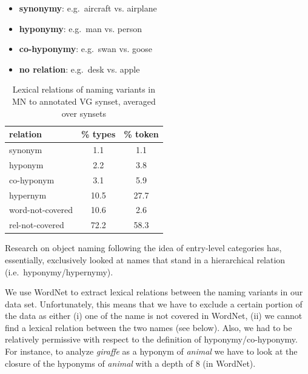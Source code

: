 \begin{itemize}
\item \textbf{synonymy}: e.g.\ aircraft vs. airplane 
\item \textbf{hyponymy}: e.g.\ man vs. person
\item \textbf{co-hyponymy}: e.g.\ swan vs. goose
\item \textbf{no relation}: e.g.\  desk vs. apple
\end{itemize}

\begin{table}
\small
\centering
\begin{tabular}{lcc}
\toprule
         relation & \% types & \% token \\
\midrule
 synonym &  1.1 &  1.1 \\
 hyponym &  2.2 &  3.8 \\
 co-hyponym &  3.1 &  5.9 \\
 hypernym &  10.5 &  27.7 \\
 word-not-covered &  10.6 &  2.6 \\
 rel-not-covered &  72.2 &  58.3 \\
\bottomrule
\end{tabular}
\caption{Lexical relations of naming variants in MN to annotated VG synset, averaged over synsets}
\label{tab:rel}
\end{table}


Research on object naming following the idea of entry-level categories has, essentially, exclusively looked at names that stand in a hierarchical relation (i.e.\ hyponymy/hypernymy).

We use WordNet to extract lexical relations between the naming variants in our data set.
Unfortunately, this means that we have to exclude a certain portion of the data as either (i) one of the name is not covered in WordNet, (ii) we cannot find a lexical relation between the two names (see below). Also, we had to be relatively permissive with respect to the definition of hyponymy/co-hyponymy. 
For instance, to analyze \textit{giraffe} as a hyponym of \textit{animal} we have to look at the closure of the hyponyms of \textit{animal} with a depth of 8 (in WordNet).

 

